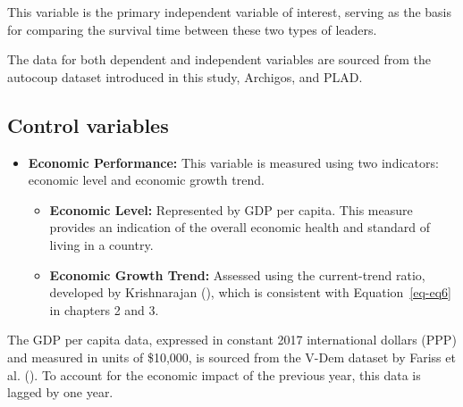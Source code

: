 \documentclass[
  12pt,
]{report}
\begin{document}
This variable is the primary independent variable of interest, serving
as the basis for comparing the survival time between these two types of
leaders.

The data for both dependent and independent variables are sourced from
the autocoup dataset introduced in this study, Archigos, and PLAD.

\subsection{Control variables}\label{control-variables}

\begin{itemize}
\item
  \textbf{Economic Performance:} This variable is measured using two
  indicators: economic level and economic growth trend.

  \begin{itemize}
  \item
    \textbf{Economic Level:} Represented by GDP per capita. This measure
    provides an indication of the overall economic health and standard
    of living in a country.
  \item
    \textbf{Economic Growth Trend:} Assessed using the current-trend
    ratio, developed by Krishnarajan
    (), which is consistent with
    Equation~\ref{eq-eq6} in chapters 2 and 3.
  \end{itemize}
\end{itemize}

The GDP per capita data, expressed in constant 2017 international
dollars (PPP) and measured in units of \$10,000, is sourced from the
V-Dem dataset by Fariss et al. (). To
account for the economic impact of the previous year, this data is
lagged by one year.
\end{document}
